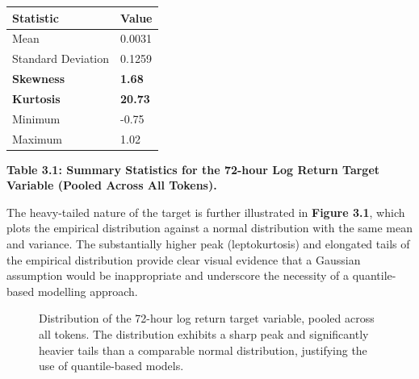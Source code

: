\documentclass[
  a4paper,
  DIV=11,
  numbers=noendperiod]{scrreprt}
\begin{document}
\begin{longtable}[]{@{}ll@{}}
\toprule\noalign{}
Statistic & Value \\
\midrule\noalign{}
\endhead
\bottomrule\noalign{}
\endlastfoot
Mean & 0.0031 \\
Standard Deviation & 0.1259 \\
\textbf{Skewness} & \textbf{1.68} \\
\textbf{Kurtosis} & \textbf{20.73} \\
Minimum & -0.75 \\
Maximum & 1.02 \\
\end{longtable}

\textbf{Table 3.1: Summary Statistics for the 72-hour Log Return Target
Variable (Pooled Across All Tokens).}

The heavy-tailed nature of the target is further illustrated in
\textbf{Figure 3.1}, which plots the empirical distribution against a
normal distribution with the same mean and variance. The substantially
higher peak (leptokurtosis) and elongated tails of the empirical
distribution provide clear visual evidence that a Gaussian assumption
would be inappropriate and underscore the necessity of a quantile-based
modelling approach.

\begin{figure}


\caption{\label{fig-return-dist}Distribution of the 72-hour log return
target variable, pooled across all tokens. The distribution exhibits a
sharp peak and significantly heavier tails than a comparable normal
distribution, justifying the use of quantile-based models.}

\end{figure}%
\end{document}
